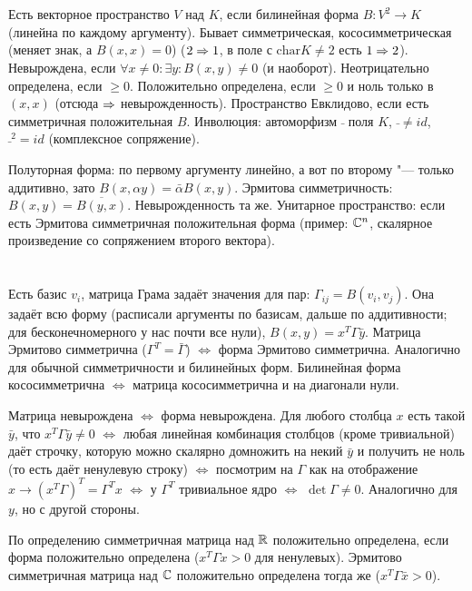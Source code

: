 \section{} %
Есть векторное пространство $V$ над $K$, если билинейная форма $B\colon V^2 \to K$ (линейна по каждому аргументу).
Бывает симметрическая, кососимметрическая (меняет знак, а $B(x,x)=0$) ($2 \Rightarrow 1$, в поле с $\mathrm{char} K \neq 2$ есть $1 \Rightarrow 2$).
Невырождена, если $\forall x \neq 0\colon \exists y\colon B(x,y)\neq 0$ (и наоборот).
Неотрицательно определена, если $\ge 0$.
Положительно определена, если $\ge 0$ и ноль только в $(x, x)$ (отсюда $\Rightarrow$ невырожденность).
Пространство Евклидово, если есть симметричная положительная $B$.
Инволюция: автоморфизм $\bar{}$ поля $K$, $\bar{} \neq id$, $\bar{}^2 = id$ (комплексное сопряжение).

Полуторная форма: по первому аргументу линейно, а вот по второму "--- только аддитивно, зато $B(x,\alpha y)=\bar\alpha B(x, y)$.
Эрмитова симметричность: $B(x,y)=\overline{B(y,x)}$.
Невырожденность та же.
Унитарное пространство: если есть Эрмитова симметричная положительная форма (пример: $\mathbb{C}^n$, скалярное произведение со сопряжением второго вектора).

\section{} %
Есть базис $v_i$, матрица Грама задаёт значения для пар: $\Gamma_{ij}=B(v_i, v_j)$.
Она задаёт всю форму (расписали аргументы по базисам, дальше по аддитивности; для бесконечномерного у нас почти все нули), $B(x,y)=x^T\Gamma \bar y$.
Матрица Эрмитово симметрична ($\Gamma^T=\bar\Gamma$) $\iff$ форма Эрмитово симметрична.
Аналогично для обычной симметричности и билинейных форм.
Билинейная форма кососимметрична $\iff$ матрица кососимметрична и на диагонали нули.

Матрица невырождена $\iff$ форма невырождена.
Для любого столбца $x$ есть такой $\bar y$, что $x^T\Gamma \bar y \neq 0$
$\iff$
любая линейная комбинация столбцов (кроме тривиальной) даёт строчку, которую можно скалярно домножить на некий $\bar y$ и получить не ноль
(то есть даёт ненулевую строку)
$\iff$
посмотрим на $\Gamma$ как на отображение $x \to (x^T\Gamma)^T=\Gamma^Tx$
$\iff$
у $\Gamma^T$ тривиальное ядро
$\iff$
$\det \Gamma \neq 0$.
Аналогично для $y$, но с другой стороны.

По определению симметричная матрица над $\mathbb{R}$ положительно определена, если форма положительно определена ($x^T\Gamma x > 0$ для ненулевых).
Эрмитово симметричная матрица над $\mathbb{C}$ положительно определена тогда же ($x^T\Gamma\bar x > 0$).

